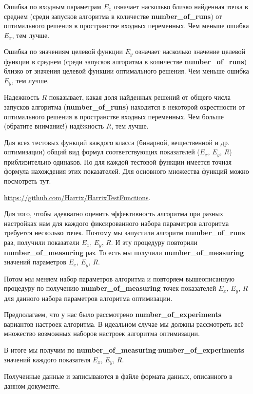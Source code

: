 \documentclass[a4paper,12pt]{article}
\begin{document}
Ошибка по входным параметрам $ E_x $ означает насколько близко найденная точка  в среднем (среди запусков алгоритма в количестве \textbf{number\_of\_runs}) от оптимального решения в пространстве входных переменных. Чем меньше ошибка $ E_x $, тем лучше.

Ошибка по значениям целевой функции $ E_y $ означает насколько значение целевой функции в среднем (среди запусков алгоритма в количестве \textbf{number\_of\_runs}) близко от значения целевой функции оптимального решения. Чем меньше ошибка $ E_y $, тем лучше.

Надежность $ R $ показывает, какая доля найденных решений от общего числа запусков алгоритма (\textbf{number\_of\_runs}) находится в некоторой окрестности от оптимального решения в пространстве входных переменных. Чем больше (обратите внимание!) надёжность $ R $, тем лучше.

Для всех тестовых функций каждого класса (бинарной, вещественной и др. оптимизации) общий вид формул соответствующих показателей ($ E_x $, $ E_y $, $ R $) приблизительно одинаков. Но для каждой тестовой функции имеется точная формула нахождения этих показателей. Для основного множества функций можно посмотреть тут:

\href {https://github.com/Harrix/HarrixTestFunctions} {https://github.com/Harrix/HarrixTestFunctions}.

Для того, чтобы адекватно оценить эффективность алгоритма при разных настройках нам для каждого фиксированного набора параметров алгоритма требуется несколько точек. Поэтому мы запустили алгоритм \textbf{number\_of\_runs} раз, получили показатели $ E_x $, $ E_y $, $ R $. И эту процедуру повторили \textbf{number\_of\_measuring} раз. То есть мы получили \textbf{number\_of\_measuring} значений параметров $ E_x $, $ E_y $, $ R $.

Потом мы меняем набор параметров алгоритма и повторяем вышеописанную процедуру по получению \textbf{number\_of\_measuring} точек показателей $ E_x $, $ E_y $, $ R $ для данного набора параметров алгоритма оптимизации.

Предполагаем, что у нас было рассмотрено \textbf{number\_of\_experiments} вариантов настроек алгоритма. В идеальном случае мы должны рассмотреть всё множество возможных наборов настроек алгоритма оптимизации.

В итоге мы получим по \textbf{number\_of\_measuring}$\cdot$\textbf{number\_of\_experiments} значений каждого показателя $ E_x $, $ E_y $, $ R $.

Полученные данные и записываются в файле формата данных, описанного в данном документе.
\end{document}
